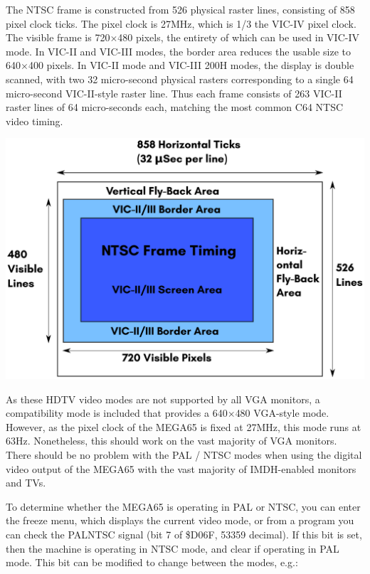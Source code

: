 The NTSC frame is constructed from 526 physical raster lines, consisting of 858 pixel clock ticks. The pixel clock is 27MHz, which is 1/3 the VIC-IV pixel clock.  The visible frame is 720$\times$480 pixels, the entirety of which can be used in VIC-IV mode. In VIC-II and VIC-III modes, the border area reduces the usable size to 640$\times$400 pixels.  In VIC-II mode and VIC-III 200H modes, the display is double scanned, with two 32 micro-second physical rasters corresponding to a single 64 micro-second VIC-II-style raster line.  Thus each frame consists of 263 VIC-II raster lines of 64 micro-seconds each, matching the most common C64 NTSC video timing.

\includegraphics[width=\linewidth]{images/illustrations/VIC-IV-NTSC-Frame.pdf}

As these HDTV video modes are not supported by all VGA monitors, a compatibility mode is included that provides a 640$\times$480 VGA-style mode. However, as the pixel clock of the MEGA65 is fixed at 27MHz, this mode runs at 63Hz.  Nonetheless, this should work on the vast majority of VGA monitors.  There should be no problem with the PAL / NTSC modes when using the digital video output of the MEGA65 with the vast majority of IMDH\texttrademark-enabled monitors and TVs.

To determine whether the MEGA65 is operating in PAL or NTSC, you can enter the freeze menu, which displays the current video mode, or from a program you can check the PALNTSC signal (bit 7 of \$D06F, 53359 decimal). If this bit is set, then the machine is operating in NTSC mode, and clear if operating in PAL mode. This bit can be modified to change between the modes, e.g.:

